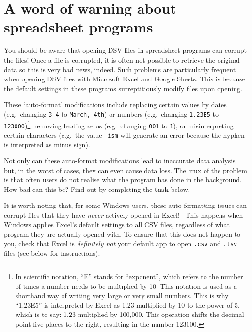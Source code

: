\documentclass[
  letterpaper,
  DIV=11,
  numbers=noendperiod]{scrreprt}
\begin{document}
\section{\texorpdfstring{A word of warning about spreadsheet
programs~️}{A word of warning about spreadsheet programs~️}}\label{sec-ExcelWarning}

You should be aware that opening DSV files in spreadsheet programs can
corrupt the files! Once a file is corrupted, it is often not possible to
retrieve the original data so this is very bad news, indeed. Such
problems are particularly frequent when opening DSV files with Microsoft
Excel and Google Sheets. This is because the default settings in these
programs surreptitiously modify files upon opening.

These `auto-format' modifications include replacing certain values by
dates (e.g.~changing \texttt{3-4} to \texttt{March,\ 4th}) or numbers
(e.g.~changing \texttt{1.23E5} to \texttt{123000})\footnote{In
  scientific notation, ``E'' stands for ``exponent'', which refers to
  the number of times a number needs to be multiplied by 10. This
  notation is used as a shorthand way of writing very large or very
  small numbers. This is why ``1.23E5'' is interpreted by Excel as 1.23
  multiplied by 10 to the power of 5, which is to say: 1.23 multiplied
  by 100,000. This operation shifts the decimal point five places to the
  right, resulting in the number 123000.}, removing leading zeros
(e.g.~changing \texttt{001} to \texttt{1}), or misinterpreting certain
characters (e.g.~the value \texttt{-ism} will generate an error because
the hyphen is interpreted as minus sign).

Not only can these auto-format modifications lead to inaccurate data
analysis but, in the worst of cases, they can even cause data loss. The
crux of the problem is that often users do not realise what the program
has done in the background. How bad can this be? Find out by completing
the {\textbf{task}} below.

It is worth noting that, for some Windows users, these auto-formatting
issues can corrupt files that they have \emph{never} actively opened in
Excel!~️ This happens when Windows applies Excel's
default settings to all CSV files, regardless of what program they are
actually opened with. To ensure that this does not happen to you, check
that Excel is \emph{definitely not} your default app to open
\texttt{.csv} and \texttt{.tsv} files (see below for instructions).
\end{document}
